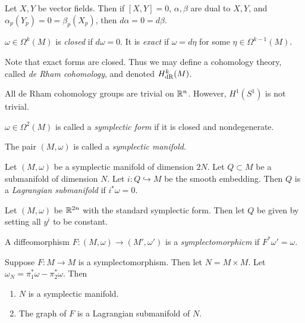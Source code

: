 \documentclass[twoside, 10pt]{article}
\begin{document}
    \begin{exm} Let $X,Y$ be vector fields. Then if $[X,Y] = 0$, $\alpha,\beta$
    are dual to $X,Y$, and $\alpha_p(Y_p) = 0 = \beta_p(X_p)$, then $d\alpha =
0 = d\beta$.  \end{exm}

    \begin{defn} $\omega \in \Omega^k(M)$ is \textit{closed} if $d\omega = 0$.
    It is \textit{exact} if $\omega = d\eta$ for some $\eta \in
\Omega^{k-1}(M)$.  \end{defn}

    Note that exact forms are closed. Thus we may define a cohomology theory,
    called \textit{de Rham cohomology}, and denoted $H^k_{\mathrm{dR}}(M)$.

    \begin{exm} All de Rham cohomology groups are trivial on $\mathbb{R}^n$. However,
    $H^1(S^1)$ is not trivial.  \end{exm}

    \begin{defn} $\omega \in \Omega^2(M)$ is called a \textit{symplectic form}
    if it is closed and nondegenerate.  \end{defn}
    
    The pair $(M,\omega)$ is called a \textit{symplectic manifold}.

    \begin{defn} Let $(M,\omega)$ be a symplectic manifold of dimension $2N$.
        Let $Q \subset M$ be a submanifold of dimension $N$. Let $i:Q
        \hookrightarrow M$ be the smooth embedding. Then $Q$ is a
        \textit{Lagrangian submanifold} if $i^*\omega = 0$.  \end{defn}

    \begin{exm} Let $(M,\omega)$ be $\mathbb{R}^{2n}$ with the standard symplectic
    form. Then let $Q$ be given by setting all $y^i$ to be constant.  \end{exm}

    \begin{defn} A diffeomorphism $F:(M,\omega) \to (M', \omega')$ is a
    \textit{symplectomorphicm} if $F^*\omega' = \omega$.  \end{defn}

    \begin{exer}[Homework] Suppose $F:M \to M$ is a symplectomorphism. Then let
        $N = M \times M$. Let $\omega_N = \pi_1^* \omega - \pi_2^* \omega$.
        Then \begin{enumerate} \item $N$ is a symplectic manifold.  \item The
            graph of $F$ is a Lagrangian submanifold of $N$.  \end{enumerate}
        \end{exer}
\end{document}
